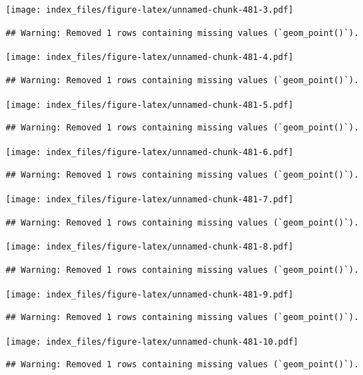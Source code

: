 \documentclass[
]{article}
\begin{document}
\texttt{[image: index\_files/figure-latex/unnamed-chunk-481-3.pdf]}

\begin{verbatim}
## Warning: Removed 1 rows containing missing values (`geom_point()`).
\end{verbatim}

\texttt{[image: index\_files/figure-latex/unnamed-chunk-481-4.pdf]}

\begin{verbatim}
## Warning: Removed 1 rows containing missing values (`geom_point()`).
\end{verbatim}

\texttt{[image: index\_files/figure-latex/unnamed-chunk-481-5.pdf]}

\begin{verbatim}
## Warning: Removed 1 rows containing missing values (`geom_point()`).
\end{verbatim}

\texttt{[image: index\_files/figure-latex/unnamed-chunk-481-6.pdf]}

\begin{verbatim}
## Warning: Removed 1 rows containing missing values (`geom_point()`).
\end{verbatim}

\texttt{[image: index\_files/figure-latex/unnamed-chunk-481-7.pdf]}

\begin{verbatim}
## Warning: Removed 1 rows containing missing values (`geom_point()`).
\end{verbatim}

\texttt{[image: index\_files/figure-latex/unnamed-chunk-481-8.pdf]}

\begin{verbatim}
## Warning: Removed 1 rows containing missing values (`geom_point()`).
\end{verbatim}

\texttt{[image: index\_files/figure-latex/unnamed-chunk-481-9.pdf]}

\begin{verbatim}
## Warning: Removed 1 rows containing missing values (`geom_point()`).
\end{verbatim}

\texttt{[image: index\_files/figure-latex/unnamed-chunk-481-10.pdf]}

\begin{verbatim}
## Warning: Removed 1 rows containing missing values (`geom_point()`).
\end{verbatim}
\end{document}
